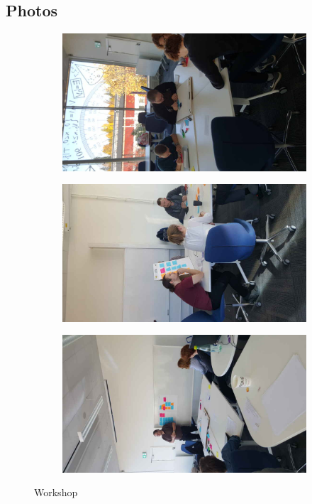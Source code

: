 \vfill
\subsection*{Photos}
\begin{figure}[hb]
\centering
    \begin{subfigure}{.32\textwidth}
        \centering
        \includegraphics[width=\textwidth, angle=270, origin=c]{img/workshop1_resized.jpg}
        \label{fig:workshop1}
    \end{subfigure}
    \begin{subfigure}{.32\textwidth}
        \centering
        \includegraphics[width=\textwidth, angle=270, origin=c]{img/workshop2_resized.jpg}
        \label{fig:workshop2}
    \end{subfigure}
    \begin{subfigure}{.32\textwidth}
        \centering
        \includegraphics[width=\textwidth, angle=270, origin=c]{img/workshop3_resized.jpg}
        \label{fig:workshop3}
    \end{subfigure}
    \caption{Workshop}
\end{figure}
\vfill

